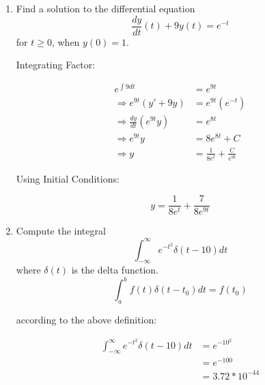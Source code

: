\documentclass{article}
\begin{document}
\begin{enumerate}
\begin{enumerate}
    \end{enumerate}
    \newpage
    \item Find a solution to the differential equation
    \begin{equation}
        \frac{dy}{dt}(t) + 9y(t) = e^{-t}
    \end{equation}
    for $t\geq0$, when $y(0) = 1$.
    \begin{center}
        Integrating Factor:
    \end{center}
    \begin{align}
        e^{\int9dt} &= e^{9t}\\
        \Rightarrow e^{9t} (y' + 9y) &= e^{9t}(e^{-t})\\
        \Rightarrow \frac{dy}{dt}(e^{9t}y)& = e^{8t}\\
        \Rightarrow e^{9t}y &= 8e^{8t} + C\\
        \Rightarrow y &= \frac{1}{8e^t} + \frac{C}{e^{9t}}
    \end{align}
    \begin{center}
        Using Initial Conditions:
    \end{center}
    \begin{equation}
        \boxed{y = \frac{1}{8e^t}+\frac{7}{8e^{9t}}}
    \end{equation}
    \itemsep 75pt
    \item Compute the integral
    \begin{equation}
        \int_{-\infty}^{\infty} e^{-t^2}\delta(t-10)dt
    \end{equation}
    where $\delta(t)$ is the delta function.
    \begin{equation}
        \int_a^bf(t)\delta(t-t_0)dt = f(t_0)
    \end{equation}
    \begin{center}
        according to the above definition:
    \end{center}
    \begin{align}
        \int_{-\infty}^{\infty} e^{-t^2}\delta(t-10)dt&= e^{-10^2}\\
        &= e^{-100}\\
        &= \boxed{3.72 * 10^{-44}}
    \end{align}
    

\end{enumerate}
\end{document}
